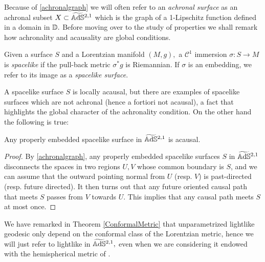 Because of \ref{achronalgraph} we will often refer to an \textit{achronal surface} as an achronal subset $X\subset\widetilde{\mathbb{A}\mathrm{d}\mathbb{S}}{}^{2,1}$ which is the graph of a 1-Lipschitz function defined in a domain in $\mathbb{D}.$ Before moving over to the study of properties we shall remark how achronality and acausality are global conditions. 

\begin{definition} Given a surface $S$ and a Lorentzian manifold $(M,g),$ a $\mathcal{C}^1$ immersion $\sigma:S\to M$ is \textit{spacelike} if the pull-back metric $\sigma^*g$ is Riemannian. If $\sigma$ is an embedding, we refer to its image as a \textit{spacelike surface}.
\end{definition}

A spacelike surface $S$ is locally acausal, but there are examples of spacelike surfaces which are not achronal (hence a fortiori not acausal), a fact that highlights the global character of the achronality condition. On the other hand the following is true: 

\begin{lemma}
    Any properly embedded spacelike surface in $\widetilde{\mathbb{A}\mathrm{d}\mathbb{S}}{}^{2,1}$ is acausal. 
\end{lemma}
\begin{proof}
    By \ref{achronalgraph}, any properly embedded spacelike surfaces $S$ in $\widetilde{\mathbb{A}\mathrm{d}\mathbb{S}}{}^{2,1}$ disconnects the spaces in two regions $U,V$ whose common boundary is $S$, and we can assume that the outward pointing normal from $U$ (resp. $V$) is past-directed (resp. future directed). It then turns out that any future oriented causal path that meets $S$ passes from $V$ towards $U$. This implies that any causal path meets $S$ at most once. 
\end{proof}

We have remarked in Theorem \ref{ConformalMetric} that unparametrized lightlike geodesic only depend on the conformal class of the Lorentzian metric, hence we will just refer to lightlike in $\widetilde{\mathbb{A}\mathrm{d}\mathbb{S}}{}^{2,1},$ even when we are considering it endowed with the hemispherical metric of . 


